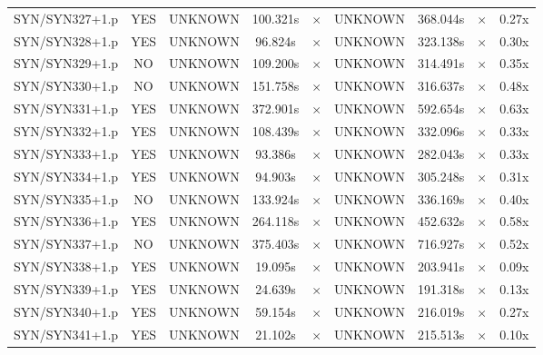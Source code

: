 \documentclass[a4paper,10pt]{article}
\begin{document}
\begin{longtable}{lcccccccc}
SYN/SYN327+1.p & YES & UNKNOWN & 100.321s & \cellcolor{mismatchcolor}$\times$ & UNKNOWN & 368.044s & \cellcolor{mismatchcolor}$\times$ & 0.27x \\
SYN/SYN328+1.p & YES & UNKNOWN & 96.824s & \cellcolor{mismatchcolor}$\times$ & UNKNOWN & 323.138s & \cellcolor{mismatchcolor}$\times$ & 0.30x \\
SYN/SYN329+1.p & NO & UNKNOWN & 109.200s & \cellcolor{mismatchcolor}$\times$ & UNKNOWN & 314.491s & \cellcolor{mismatchcolor}$\times$ & 0.35x \\
SYN/SYN330+1.p & NO & UNKNOWN & 151.758s & \cellcolor{mismatchcolor}$\times$ & UNKNOWN & 316.637s & \cellcolor{mismatchcolor}$\times$ & 0.48x \\
SYN/SYN331+1.p & YES & UNKNOWN & 372.901s & \cellcolor{mismatchcolor}$\times$ & UNKNOWN & 592.654s & \cellcolor{mismatchcolor}$\times$ & 0.63x \\
SYN/SYN332+1.p & YES & UNKNOWN & 108.439s & \cellcolor{mismatchcolor}$\times$ & UNKNOWN & 332.096s & \cellcolor{mismatchcolor}$\times$ & 0.33x \\
SYN/SYN333+1.p & YES & UNKNOWN & 93.386s & \cellcolor{mismatchcolor}$\times$ & UNKNOWN & 282.043s & \cellcolor{mismatchcolor}$\times$ & 0.33x \\
SYN/SYN334+1.p & YES & UNKNOWN & 94.903s & \cellcolor{mismatchcolor}$\times$ & UNKNOWN & 305.248s & \cellcolor{mismatchcolor}$\times$ & 0.31x \\
SYN/SYN335+1.p & NO & UNKNOWN & 133.924s & \cellcolor{mismatchcolor}$\times$ & UNKNOWN & 336.169s & \cellcolor{mismatchcolor}$\times$ & 0.40x \\
SYN/SYN336+1.p & YES & UNKNOWN & 264.118s & \cellcolor{mismatchcolor}$\times$ & UNKNOWN & 452.632s & \cellcolor{mismatchcolor}$\times$ & 0.58x \\
SYN/SYN337+1.p & NO & UNKNOWN & 375.403s & \cellcolor{mismatchcolor}$\times$ & UNKNOWN & 716.927s & \cellcolor{mismatchcolor}$\times$ & 0.52x \\
SYN/SYN338+1.p & YES & UNKNOWN & 19.095s & \cellcolor{mismatchcolor}$\times$ & UNKNOWN & 203.941s & \cellcolor{mismatchcolor}$\times$ & 0.09x \\
SYN/SYN339+1.p & YES & UNKNOWN & 24.639s & \cellcolor{mismatchcolor}$\times$ & UNKNOWN & 191.318s & \cellcolor{mismatchcolor}$\times$ & 0.13x \\
SYN/SYN340+1.p & YES & UNKNOWN & 59.154s & \cellcolor{mismatchcolor}$\times$ & UNKNOWN & 216.019s & \cellcolor{mismatchcolor}$\times$ & 0.27x \\
SYN/SYN341+1.p & YES & UNKNOWN & 21.102s & \cellcolor{mismatchcolor}$\times$ & UNKNOWN & 215.513s & \cellcolor{mismatchcolor}$\times$ & 0.10x \\

\end{longtable}
\end{document}
